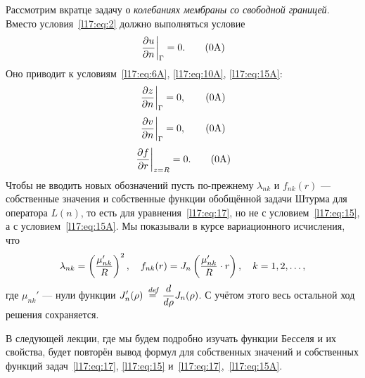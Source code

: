 Рассмотрим вкратце задачу о \emph{колебаниях мембраны со свободной границей}. Вместо условия~\eqref{l17:eq:2} должно выполняться условие\setcounter{equation}{2}
\begin{equation}\label{l17:eq:2A}
	\hfill\left.\pder{u}{n}\right|_{\Gamma}=0.\tag{\theequation A}\hfill
\end{equation} 
Оно приводит к условиям~\eqref{l17:eq:6A}, \eqref{l17:eq:10A}, \eqref{l17:eq:15A}:\setcounter{equation}{6}
\begin{equation}\label{l17:eq:6A}
	\hfill\left.\pder{z}{n}\right|_{\Gamma}=0,\tag{\theequation A}\hfill
\end{equation}\setcounter{equation}{10}
\begin{equation}\label{l17:eq:10A}
	\hfill\left.\pder{v}{n}\right|_{\Gamma}=0,\tag{\theequation A}\hfill
\end{equation} \setcounter{equation}{15}
\begin{equation}\label{l17:eq:15A}
	\hfill\left.\pder{f}{r}\right|_{z=R}=0.\tag{\theequation A}\hfill
\end{equation} \setcounter{equation}{25}
Чтобы не вводить новых обозначений пусть по-прежнему $\lambda_{nk}$ и $f_{nk}(r)$ --- собственные значения и собственные функции обобщённой задачи Штурма для оператора $L(n)$, то есть для уравнения~\eqref{l17:eq:17}, но не с условием~\eqref{l17:eq:15}, а с условием~\eqref{l17:eq:15A}. Мы показывали в курсе вариационного исчисления, что 
\begin{equation*}
	\hfill\lambda_{nk}=\left(\frac{\mu_{nk}'}{R}\right)^2,\quad f_{nk}(r)=J_n\left(\frac{\mu_{nk}'}{R}\cdot r\right),\quad k=1,2,\ldots,\hfill
\end{equation*}
где $\mu_{nk}'$ --- нули функции $\displaystyle J_n'(\rho)\stackrel{\hspace{0.09 cm}de\!f}{=}\frac{d}{d\rho}J_n(\rho)$. С учётом этого весь остальной ход решения сохраняется.
\begin{_rem}
	В следующей лекции, где мы будем подробно изучать функции Бесселя и их свойства, будет повторён вывод формул для собственных значений и собственных функций задач~\eqref{l17:eq:17}, \eqref{l17:eq:15} и~\eqref{l17:eq:17},~\eqref{l17:eq:15A}.
\end{_rem}